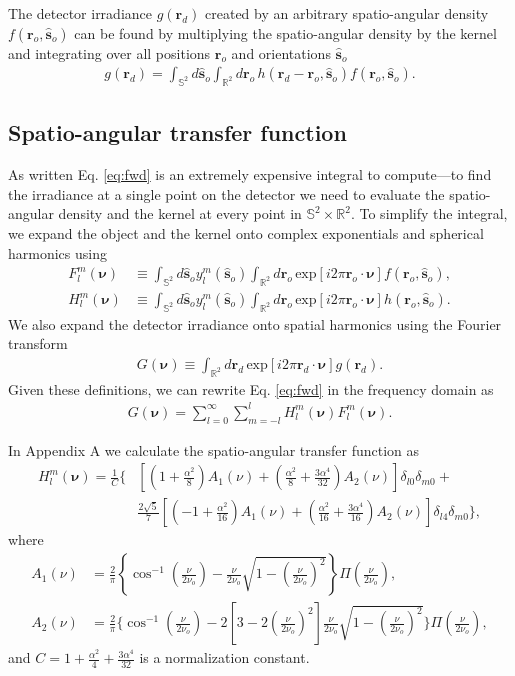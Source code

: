 \documentclass{osa-article}
\providecommand{\ro}[1]{\mathbf{\mathbf{r}}_o}
\providecommand{\so}[1]{\mathbf{\hat{s}}_o}
\providecommand{\rd}[1]{\mathbf{r}_d}
\providecommand{\mbb}[1]{\mathbb{#1}}
\providecommand{\bs}[1]{\boldsymbol{#1}}
\begin{document}
The detector irradiance $g(\rd{})$ created by an arbitrary spatio-angular
density $f(\ro{}, \so{})$ can be found by multiplying the spatio-angular density
by the kernel and integrating over all positions $\ro{}$ and orientations
$\so{}$
\begin{align}
g(\rd{}) = \int_{\mbb{S}^2}d\so{}\int_{\mbb{R}^2}d\ro{}\, h(\rd{} -\ro{}, \so{})f(\ro{}, \so{}). \label{eq:fwd}
\end{align}

\subsection{Spatio-angular transfer function}
As written Eq. \ref{eq:fwd} is an extremely expensive integral to compute---to
find the irradiance at a single point on the detector we need to evaluate the
spatio-angular density and the kernel at every point in
$\mbb{S}^2\times \mbb{R}^2$. To simplify the integral, we expand the object and
the kernel onto complex exponentials and spherical harmonics using
\begin{align}
  F_l^m(\bs{\nu}) &\equiv \int_{\mbb{S}^2}d\so{}y_l^m(\so{})\int_{\mbb{R}^2}d\ro{}\,\text{exp}\left[i2\pi \ro{}\cdot\bs{\nu}\right]f(\ro{}, \so{}),\\
  H_l^m(\bs{\nu}) &\equiv \int_{\mbb{S}^2}d\so{}y_l^m(\so{})\int_{\mbb{R}^2}d\ro{}\,\text{exp}\left[i2\pi \ro{}\cdot\bs{\nu}\right]h(\ro{}, \so{}).
\end{align}
We also expand the detector irradiance onto spatial harmonics using the Fourier
transform
\begin{align}
  G(\bs{\nu}) \equiv \int_{\mbb{R}^2}d\rd{}\,\text{exp}\left[i2\pi \rd{}\cdot\bs{\nu}\right]g(\rd{}).
\end{align}
Given these definitions, we can rewrite Eq. \ref{eq:fwd} in the frequency domain as 
\begin{align}
G(\bs{\nu}) = \sum_{l=0}^{\infty}\sum_{m=-l}^{l}H_l^m(\bs{\nu})F_l^m(\bs{\nu}). 
\end{align}

In Appendix A we calculate the spatio-angular transfer function as
\begin{align}
  H_l^m(\bs{\nu}) = \frac{1}{C}\Bigg\{&\left[\left(1 + \frac{\alpha^2}{8}\right)A_1(\nu) + \left(\frac{\alpha^2}{8} + \frac{3\alpha^4}{32}\right)A_2(\nu)\right]\delta_{l0}\delta_{m0}+\nonumber\\&\frac{2\sqrt{5}}{7}\left[\left(-1 + \frac{\alpha^2}{16}\right)A_1(\nu) + \left(\frac{\alpha^2}{16} + \frac{3\alpha^4}{16}\right)A_2(\nu)\right]\delta_{l4}\delta_{m0}\Bigg\}, 
\end{align}
where
\begin{align}
  A_1(\nu) &= \frac{2}{\pi}\left\{\cos^{-1}\left(\frac{\nu}{2\nu_o}\right) - \frac{\nu}{2\nu_o}\sqrt{1 - \left(\frac{\nu}{2\nu_o}\right)^2}\right\}\Pi\left(\frac{\nu}{2\nu_o}\right), \\
  A_2(\nu) &= \frac{2}{\pi}\Bigg\{\cos^{-1}\left(\frac{\nu}{2\nu_o}\right) - 2\left[3 - 2\left(\frac{\nu}{2\nu_o}\right)^2\right]\frac{\nu}{2\nu_o}\sqrt{1 - \left(\frac{\nu}{2\nu_o}\right)^2}\Bigg\}\Pi\left(\frac{\nu}{2\nu_o}\right), 
\end{align}
and $C = 1 + \frac{\alpha^2}{4} + \frac{3\alpha^4}{32}$ is a normalization
constant.
\end{document}
